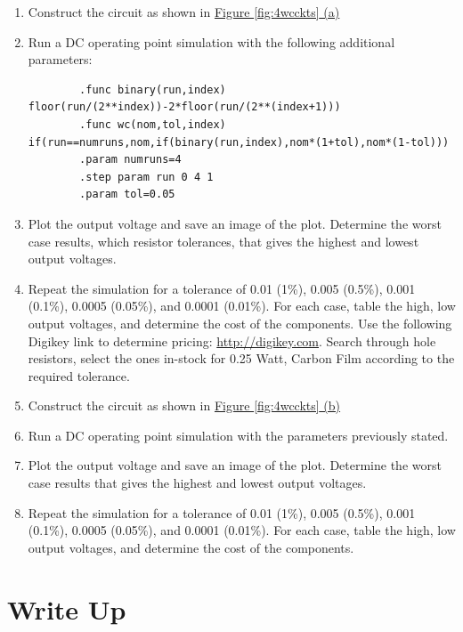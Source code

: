\begin{enumerate}
	\item Construct the circuit as shown in \hyperref[fig:4wcckts]{Figure \ref*{fig:4wcckts} (a)}
	\item Run a DC operating point simulation with the following additional parameters:
\begingroup
    \fontsize{10pt}{12pt}\selectfont
	\begin{verbatim}
		.func binary(run,index) floor(run/(2**index))-2*floor(run/(2**(index+1)))
		.func wc(nom,tol,index) if(run==numruns,nom,if(binary(run,index),nom*(1+tol),nom*(1-tol)))
		.param numruns=4
		.step param run 0 4 1
		.param tol=0.05
	\end{verbatim}
\endgroup

	\item Plot the output voltage and save an image of the plot. Determine the worst case results, which resistor tolerances, that gives the highest and lowest output voltages. \label{itm:4ssec4itm3}
	\item Repeat the simulation for a tolerance of 0.01 (1\%), 0.005 (0.5\%), 0.001 (0.1\%), 0.0005 (0.05\%), and 0.0001 (0.01\%). For each case, table the high, low output voltages, and determine the cost of the components. Use the following Digikey link to determine pricing: \url{http://digikey.com}. Search through hole resistors, select the ones in-stock for 0.25 Watt, Carbon Film according to the required tolerance.  \label{itm:4ssec4itm4}
	\item Construct the circuit as shown in \hyperref[fig:4wcckts]{Figure \ref*{fig:4wcckts} (b)}
	\item Run a DC operating point simulation with the parameters previously stated.
	\item Plot the output voltage and save an image of the plot. Determine the worst case results that gives the highest and lowest output voltages. \label{itm:4ssec4itm7}
	\item Repeat the simulation for a tolerance of 0.01 (1\%), 0.005 (0.5\%), 0.001 (0.1\%), 0.0005 (0.05\%), and 0.0001 (0.01\%). For each case, table the high, low output voltages, and determine the cost of the components. \label{itm:4ssec4itm8}
\end{enumerate}

\section{Write Up}

